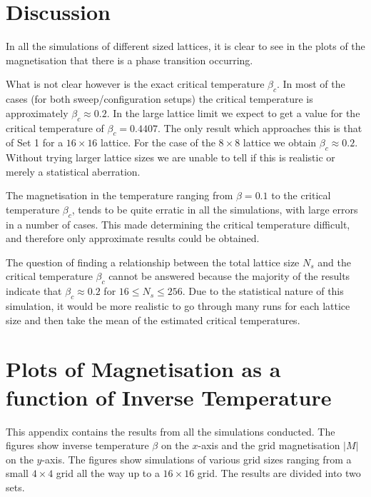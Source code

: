 \documentclass[a4paper]{IEEEtran}
\begin{document}
    \section{Discussion}

    In all the simulations of different sized lattices, it is
    clear to see in the plots of the magnetisation that there is a phase
    transition occurring.

    What is not clear however is the exact critical temperature $\beta_c$.
    In most of the cases (for both sweep/configuration setups) the
    critical temperature is approximately $\beta_c \approx 0.2$.
    In the large lattice limit we expect to get a value for the critical
    temperature of $\beta_c = 0.4407$. The only result which approaches
    this is that of Set 1 for a $16 \times 16$ lattice. For the case
    of the $8 \times 8$ lattice we obtain $\beta_c \approx 0.2$.
    Without trying
    larger lattice sizes we are unable to tell if this is realistic
    or merely a statistical aberration.

    The magnetisation in the temperature ranging from $\beta = 0.1$ to 
    the critical temperature $\beta_c$, tends to be quite erratic
    in all the simulations, with large errors in a number of cases.
    This made determining the critical temperature difficult, and
    therefore only approximate results could be obtained.

    The question of finding a relationship between the total lattice
    size $N_s$ and the critical temperature $\beta_c$ cannot be answered
    because the majority of the results indicate that $\beta_c \approx 0.2$
    for $16 \le N_s \le 256 $.
    Due to the statistical nature of this simulation, it would be more
    realistic to go through many runs for each lattice size and then
    take the mean of the estimated critical temperatures.





    \section{Plots of Magnetisation as a function of Inverse Temperature} 
    This appendix contains the results from all the simulations conducted.
    The figures show inverse temperature $\beta$ on the $x$-axis and the 
    grid magnetisation $|M|$ on the $y$-axis. The figures show simulations of 
    various grid sizes ranging from a small $4 \times 4$ grid all the way up
    to a $16 \times 16$ grid. The results are divided into two sets.
\end{document}
